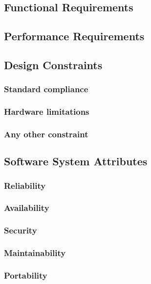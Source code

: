 		

\subsection{Functional Requirements}
\subsection{Performance Requirements}
\subsection{Design Constraints}
	\subsubsection{Standard compliance}
	\subsubsection{Hardware limitations}
	\subsubsection{Any other constraint}
\subsection{Software System Attributes} 
	\subsubsection{Reliability}
	\subsubsection{Availability}
	\subsubsection{Security}
	\subsubsection{Maintainability}
	\subsubsection{Portability}